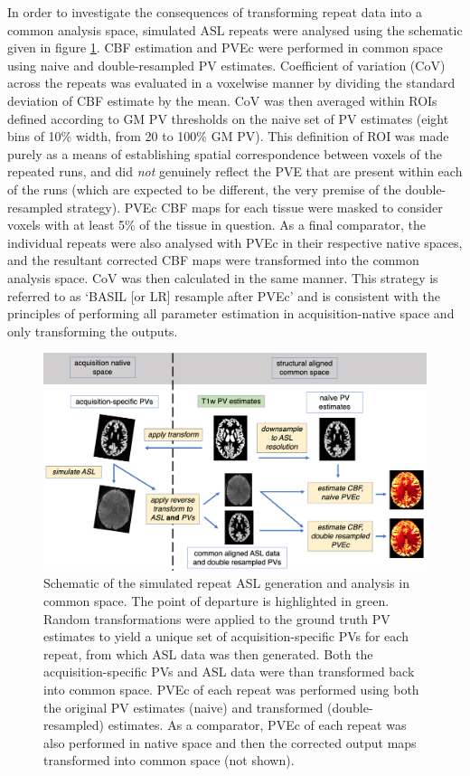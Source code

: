 \documentclass[12pt]{report}
\begin{document}
In order to investigate the consequences of transforming repeat data into a common analysis space, simulated ASL repeats were analysed using the schematic given in figure \ref{simrpt_schema}. CBF estimation and PVEc were performed in common space using naive and double-resampled PV estimates. Coefficient of variation (CoV) across the repeats was evaluated in a voxelwise manner by dividing the standard deviation of CBF estimate by the mean. CoV was then averaged within ROIs defined according to GM PV thresholds on the naive set of PV estimates (eight bins of 10\% width, from 20 to 100\% GM PV). This definition of ROI was made purely as a means of establishing spatial correspondence between voxels of the repeated runs, and did \textit{not} genuinely reflect the PVE that are present within each of the runs (which are expected to be different, the very premise of the double-resampled strategy). PVEc CBF maps for each tissue were masked to consider voxels with at least 5\% of the tissue in question. As a final comparator, the individual repeats were also analysed with PVEc in their respective native spaces, and the resultant corrected CBF maps were transformed into the common analysis space. CoV was then calculated in the same manner. This strategy is referred to as `BASIL [or LR] resample after PVEc' and is consistent with the principles of performing all parameter estimation in acquisition-native space and only transforming the outputs.

\begin{figure}[h]
\centering
\includegraphics[width = \textwidth]{simrpt_schema.png}
\caption{Schematic of the simulated repeat ASL generation and analysis in common space. The point of departure is highlighted in green. Random transformations were applied to the ground truth PV estimates to yield a unique set of acquisition-specific PVs for each repeat, from which ASL data was then generated. Both the acquisition-specific PVs and ASL data were than transformed back into common space. PVEc of each repeat was performed using both the original PV estimates (naive) and transformed (double-resampled) estimates. As a comparator, PVEc of each repeat was also performed in native space and then the corrected output maps transformed into common space (not shown).}
\label{simrpt_schema}
\end{figure}
\end{document}
